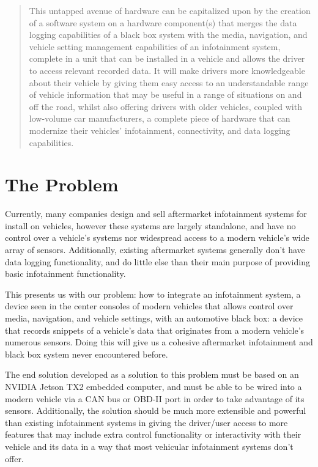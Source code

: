 \documentclass[onecolumn, draftclsnofoot,10pt, compsoc]{IEEEtran}
\begin{document}
\begin{titlepage}
\begin{singlespace}
\begin{abstract}
This untapped avenue of hardware can be capitalized upon by the creation of a software system on a hardware component(s) that merges the data logging capabilities of a black box system with the media, navigation, and vehicle setting management capabilities of an infotainment system, complete in a unit that can be installed in a vehicle and allows the driver to access relevant recorded data. 
It will make drivers more knowledgeable about their vehicle by giving them easy access to an understandable range of vehicle information that may be useful in a range of situations on and off the road, whilst also offering drivers with older vehicles, coupled with low-volume car manufacturers, a complete piece of hardware that can modernize their vehicles' infotainment, connectivity, and data logging capabilities.
        \end{abstract}     
    \end{singlespace}
\end{titlepage}
\newpage
{}
\tableofcontents
\clearpage

\section{The Problem}
Currently, many companies design and sell aftermarket infotainment systems for install on vehicles, however these systems are largely standalone, and have no control over a vehicle's systems nor widespread access to a modern vehicle's wide array of sensors. Additionally, existing aftermarket systems generally don't have data logging functionality, and do little else than their main purpose of providing basic infotainment functionality.\par
This presents us with our problem: how to integrate an infotainment system, a device seen in the center consoles of modern vehicles that allows control over media, navigation, and vehicle settings, with an automotive black box: a device that records snippets of a vehicle's data that originates from a modern vehicle's numerous sensors. Doing this will give us a cohesive aftermarket infotainment and black box system never encountered before.\par
The end solution developed as a solution to this problem must be based on an NVIDIA Jetson TX2 embedded computer, and must be able to be wired into a modern vehicle via a CAN bus or OBD-II port in order to take advantage of its sensors. Additionally, the solution should be much more extensible and powerful than existing infotainment systems in giving the driver/user access to more features that may include extra control functionality or interactivity with their vehicle and its data in a way that most vehicular infotainment systems don't offer.\par
\end{document}
